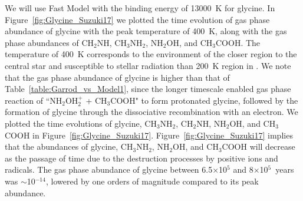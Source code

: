 \documentclass{aastex61}
\begin{document}
We will use Fast Model with the binding energy of 13000~K for glycine.
%
In Figure~\ref{fig:Glycine_Suzuki17} we plotted the time evolution of gas phase abundance of glycine with the peak temperature of 400~K, along with the gas phase abundances of CH$_2$NH, CH$_3$NH$_2$, NH$_2$OH, and CH$_3$COOH.
%
The temperature of 400~K corresponds to the environment of the closer region to the central star and susceptible to stellar radiation than  200~K region in \cite{Suzuki17}.
%
We note that the gas phase abundance of glycine is higher than that of Table~\ref{table:Garrod_vs_Model1}, since the longer timescale enabled gas phase reaction of ``NH$_2$OH$_2^+$ + CH$_3$COOH" to form protonated glycine, followed by the formation of glycine through the dissociative recombination with an electron.
%
We plotted the time evolutions of glycine, CH$_3$NH$_2$, CH$_2$NH, NH$_2$OH, and CH$_3$COOH in Figure~\ref{fig:Glycine_Suzuki17}. 
%
Figure~\ref{fig:Glycine_Suzuki17} implies that the abundances of glycine, CH$_3$NH$_2$, NH$_2$OH, and CH$_3$COOH will decrease as the passage of time due to the destruction processes by positive ions and radicals.
%
The gas phase abundance of glycine between 6.5$\times$10$^{5}$ and 8$\times$10$^{5}$~years was $\sim$10$^{-14}$, lowered by one orders of magnitude compared to its peak abundance.
%
\end{document}

